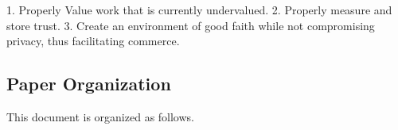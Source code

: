1. Properly Value work that is currently undervalued. 2. Properly measure and store trust. 3. Create an environment of good faith while not compromising privacy, thus facilitating commerce. 

\subsection{Paper Organization}

This document is organized as follows.

% 
% 


\newpage
\newpage